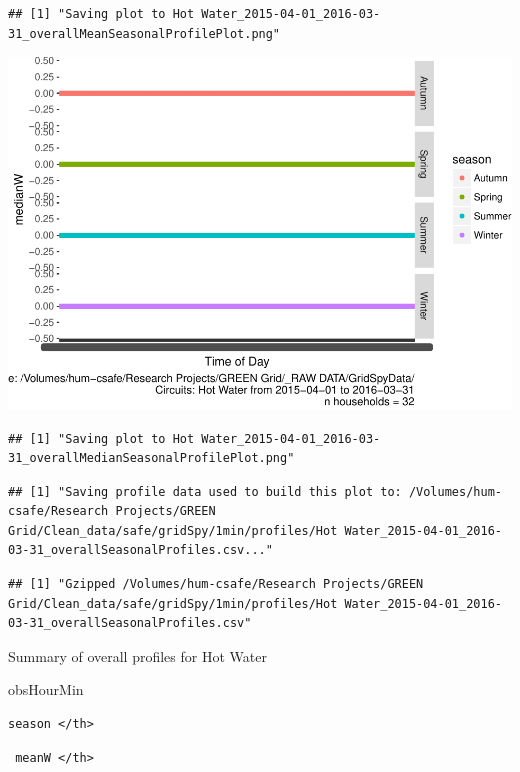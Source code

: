 \documentclass[]{article}
\begin{document}
\begin{verbatim}
## [1] "Saving plot to Hot Water_2015-04-01_2016-03-31_overallMeanSeasonalProfilePlot.png"
\end{verbatim}

\includegraphics{nzGGHouseholdPowerDemandProfile_Hot Water_2015-04-01_2016-03-31_files/figure-latex/overall profiles by season-2.pdf}

\begin{verbatim}
## [1] "Saving plot to Hot Water_2015-04-01_2016-03-31_overallMedianSeasonalProfilePlot.png"
\end{verbatim}

\begin{verbatim}
## [1] "Saving profile data used to build this plot to: /Volumes/hum-csafe/Research Projects/GREEN Grid/Clean_data/safe/gridSpy/1min/profiles/Hot Water_2015-04-01_2016-03-31_overallSeasonalProfiles.csv..."
\end{verbatim}

\begin{verbatim}
## [1] "Gzipped /Volumes/hum-csafe/Research Projects/GREEN Grid/Clean_data/safe/gridSpy/1min/profiles/Hot Water_2015-04-01_2016-03-31_overallSeasonalProfiles.csv"
\end{verbatim}

Summary of overall profiles for Hot Water

obsHourMin

\begin{verbatim}
season </th>
\end{verbatim}

\begin{verbatim}
 meanW </th>
\end{verbatim}
\end{document}
